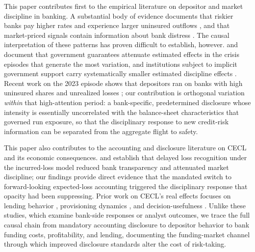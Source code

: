 This paper contributes first to the empirical literature on depositor and market
discipline in banking.  A substantial body of evidence documents that riskier
banks pay higher rates and experience larger uninsured outflows
\citep{park1995market, martinez2001depositors, maechler2006dynamic,
egan2017deposit}, and that market-priced signals contain information about bank
distress \citep{flannery1996evidence, nier2006market}.  The causal
interpretation of these patterns has proven difficult to establish, however.
\citet{bennett2015market} and \citet{berger2015depositors} document that
government guarantees attenuate estimated effects in the crisis episodes that
generate the most variation, and institutions subject to implicit government
support carry systematically smaller estimated discipline effects
\citep{jacewitz2018deposit}.  Recent work on the 2023 episode shows that
depositors ran on banks with high uninsured shares and unrealized losses
\citep{caglio2024depositors}; our contribution is orthogonal variation
\emph{within} that high-attention period: a bank-specific, predetermined
disclosure whose intensity is essentially uncorrelated with the balance-sheet
characteristics that governed run exposure, so that the disciplinary response
to new credit-risk information can be separated from the aggregate flight to
safety.

This paper also contributes to the accounting and disclosure literature on CECL
and its economic consequences.  \citet{bushman2012accounting} and
\citet{bushman2015delayed} establish that delayed loss recognition under the
incurred-loss model reduced bank transparency and attenuated market discipline;
our findings provide direct evidence that the mandated switch to forward-looking
expected-loss accounting triggered the disciplinary response that opacity had
been suppressing.  Prior work on CECL's real effects focuses on lending behavior
\citep{granja2025current}, provisioning dynamics \citep{kim2026current}, and
decision-usefulness \citep{gee2022decision}.  Unlike these studies, which examine
bank-side responses or analyst outcomes, we trace the full causal chain from
mandatory accounting disclosure to depositor behavior to bank funding costs,
profitability, and lending, documenting the funding-market channel through which
improved disclosure standards alter the cost of risk-taking.

